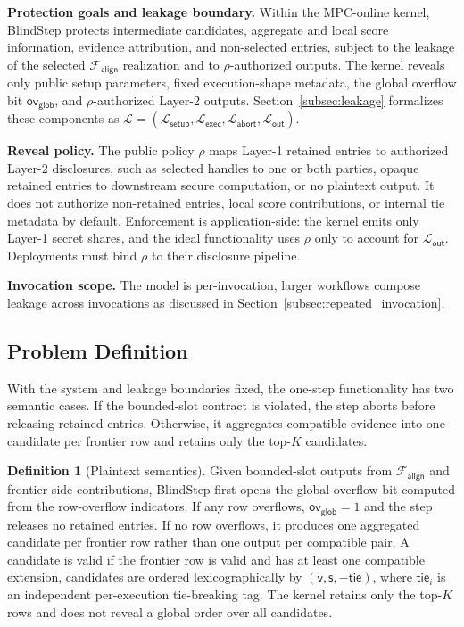 \documentclass[conference,compsoc,letterpaper]{IEEEtran}
\theoremstyle{definition}
\newtheorem{definition}[theorem]{Definition}
\theoremstyle{remark}
\newcommand{\BlindStep}{BlindStep\xspace}
\newcommand{\Leak}{\mathcal{L}}
\newcommand{\LeakSetup}{\Leak_{\mathsf{setup}}}
\newcommand{\LeakExec}{\Leak_{\mathsf{exec}}}
\newcommand{\LeakOut}{\Leak_{\mathsf{out}}}
\newcommand{\LeakAbort}{\Leak_{\mathsf{abort}}}
\newcommand{\Falign}{\mathcal{F}_{\mathsf{align}}}
\newcommand{\policy}{\rho}
\newcommand{\valid}{\mathsf{v}}
\newcommand{\score}{\mathsf{s}}
\newcommand{\tie}{\mathsf{tie}}
\newcommand{\globaloverflow}{\mathsf{ov}_{\mathsf{glob}}}
\begin{document}
\smallskip

\noindent\textbf{Protection goals and leakage boundary.}
Within the MPC-online kernel, \BlindStep{} protects intermediate candidates, aggregate and local score information, evidence attribution, and non-selected entries, subject to the leakage of the selected $\Falign{}$ realization and to $\policy$-authorized outputs.
The kernel reveals only public setup parameters, fixed execution-shape metadata, the global overflow bit $\globaloverflow$, and $\policy$-authorized Layer-2 outputs.
Section~\ref{subsec:leakage} formalizes these components as $\Leak=(\LeakSetup,\LeakExec,\LeakAbort,\LeakOut)$.
\smallskip

\noindent\textbf{Reveal policy.}
The public policy $\policy$ maps Layer-1 retained entries to authorized Layer-2 disclosures, such as selected handles to one or both parties, opaque retained entries to downstream secure computation, or no plaintext output.
It does not authorize non-retained entries, local score contributions, or internal tie metadata by default.
Enforcement is application-side: the kernel emits only Layer-1 secret shares, and the ideal functionality uses $\policy$ only to account for $\LeakOut$.
Deployments must bind $\policy$ to their disclosure pipeline.
\smallskip

\noindent\textbf{Invocation scope.}
The model is per-invocation, larger workflows compose leakage across invocations as discussed in Section~\ref{subsec:repeated_invocation}.

\subsection{Problem Definition}
\label{subsec:problem_definition}

With the system and leakage boundaries fixed, the one-step functionality has two semantic cases.
If the bounded-slot contract is violated, the step aborts before releasing retained entries.
Otherwise, it aggregates compatible evidence into one candidate per frontier row and retains only the top-$K$ candidates.

\begin{definition}[{Plaintext semantics}]
Given bounded-slot outputs from $\Falign{}$ and frontier-side contributions, \BlindStep{} first opens the global overflow bit computed from the row-overflow indicators.
If any row overflows, $\globaloverflow=1$ and the step releases no retained entries.
If no row overflows, it produces one aggregated candidate per frontier row rather than one output per compatible pair.
A candidate is valid if the frontier row is valid and has at least one compatible extension, candidates are ordered lexicographically by $(\valid,\score,-\tie)$, where $\tie_i$ is an independent per-execution tie-breaking tag.
The kernel retains only the top-$K$ rows and does not reveal a global order over all candidates.

\end{definition}
\end{document}
